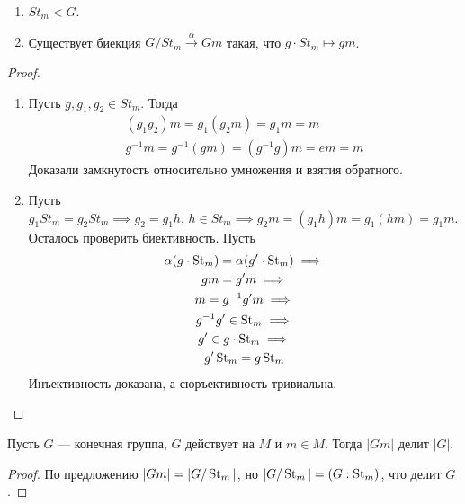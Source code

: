 \documentclass[../main.tex]{subfiles}
\begin{document}
\begin{theorem-non}
  \begin{enumerate}
    \item $St_m < G$.
    \item Существует биекция $G/St_m \overset{\alpha}{\longrightarrow} Gm$ такая, что $g \cdot St_m \mapsto gm$.
  \end{enumerate}
\end{theorem-non}
\begin{proof}
  \begin{enumerate}
    \item Пусть $g, g_1, g_2 \in St_m$. Тогда
    \begin{equation*}
      \begin{gathered}
        (g_1g_2)m = g_1(g_2m) = g_1m = m \\
        g^{-1}m = g^{-1}(gm) = (g^{-1}g) m = em = m
      \end{gathered}
    \end{equation*}
    Доказали замкнутость относительно умножения и взятия обратного.
    \item Пусть $g_1St_m  = g_2St_m \implies g_2 = g_1h, \, h \in St_m \implies g_2m = (g_1h)m = g_1(hm) = g_1m$. Осталось проверить биективность. Пусть
    \begin{equation*}
      \begin{gathered}
        \alpha(g \cdot \operatorname{St}_m) = \alpha(g' \cdot \operatorname{St}_m) \implies \\
        gm = g'm \implies \\
        m = g^{-1}g'm \implies \\
        g^{-1}g' \in \operatorname{St}_m \implies \\
        g' \in g \cdot \operatorname{St}_m \implies \\
        g'\operatorname{St}_m = g\operatorname{St}_m
      \end{gathered}
    \end{equation*}
    Инъективность доказана, а сюръективность тривиальна.
  \end{enumerate}
\end{proof}
\begin{corollary*}
  Пусть $G$ --- конечная группа, $G$ действует на $M$ и $m \in M$. Тогда $|Gm|$ делит $|G|$.
\end{corollary*}
\begin{proof}
  По предложению $|Gm| = |G/\operatorname{St}_m|$, но $|G/\operatorname{St}_m| = (G : \operatorname{St}_m)$, что делит $G$.
\end{proof}
\end{document}
